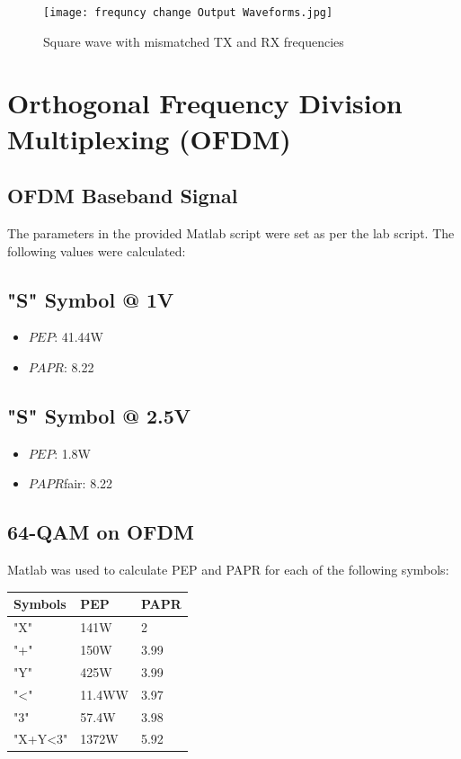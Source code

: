 \documentclass[a4paper]{article}
\begin{document}
\begin{figure}[htbp]
\centering

\texttt{[image: frequncy change Output Waveforms.jpg]}
\caption{Square wave with mismatched TX and RX frequencies }

\end{figure}


\section{Orthogonal Frequency Division Multiplexing (OFDM)}
\subsection{OFDM Baseband Signal}
\noindent The parameters in the provided Matlab script were set as per the lab script.
The following values were calculated:
\subsection*{"S" Symbol @ 1V}
\begin{itemize}
    \item ${PEP}$: 41.44W
    \item ${PAPR}$: 8.22
\end{itemize}

\subsection*{"S" Symbol @ 2.5V}
\begin{itemize}
    \item ${PEP}$: 1.8W
    \item ${PAPR}$fair: 8.22
\end{itemize}

\subsection{64-QAM on OFDM}
\noindent Matlab was used to calculate PEP and PAPR for each of the following symbols:\\ 

\begin{tabular}{|l|l|l|}
\hline
\textbf{Symbols} & \textbf{PEP} & \textbf{PAPR} \\ \hline
"X" & 141W & 2 \\ \hline
"+" & 150W & 3.99 \\ \hline
"Y" & 425W & 3.99 \\ \hline
"<" & 11.4WW & 3.97 \\ \hline
"3" & 57.4W & 3.98 \\ \hline
"X+Y<3" & 1372W & 5.92 \\ \hline
\end{tabular} \\
\end{document}
